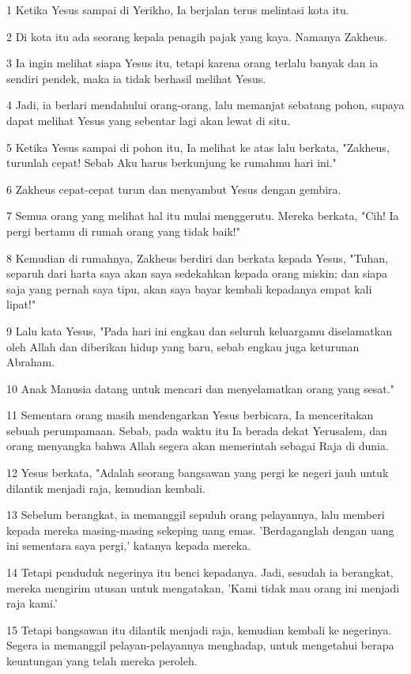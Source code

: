 \par 1 Ketika Yesus sampai di Yerikho, Ia berjalan terus melintasi kota itu.
\par 2 Di kota itu ada seorang kepala penagih pajak yang kaya. Namanya Zakheus.
\par 3 Ia ingin melihat siapa Yesus itu, tetapi karena orang terlalu banyak dan ia sendiri pendek, maka ia tidak berhasil melihat Yesus.
\par 4 Jadi, ia berlari mendahului orang-orang, lalu memanjat sebatang pohon, supaya dapat melihat Yesus yang sebentar lagi akan lewat di situ.
\par 5 Ketika Yesus sampai di pohon itu, Ia melihat ke atas lalu berkata, "Zakheus, turunlah cepat! Sebab Aku harus berkunjung ke rumahmu hari ini."
\par 6 Zakheus cepat-cepat turun dan menyambut Yesus dengan gembira.
\par 7 Semua orang yang melihat hal itu mulai menggerutu. Mereka berkata, "Cih! Ia pergi bertamu di rumah orang yang tidak baik!"
\par 8 Kemudian di rumahnya, Zakheus berdiri dan berkata kepada Yesus, "Tuhan, separuh dari harta saya akan saya sedekahkan kepada orang miskin; dan siapa saja yang pernah saya tipu, akan saya bayar kembali kepadanya empat kali lipat!"
\par 9 Lalu kata Yesus, "Pada hari ini engkau dan seluruh keluargamu diselamatkan oleh Allah dan diberikan hidup yang baru, sebab engkau juga keturunan Abraham.
\par 10 Anak Manusia datang untuk mencari dan menyelamatkan orang yang sesat."
\par 11 Sementara orang masih mendengarkan Yesus berbicara, Ia menceritakan sebuah perumpamaan. Sebab, pada waktu itu Ia berada dekat Yerusalem, dan orang menyangka bahwa Allah segera akan memerintah sebagai Raja di dunia.
\par 12 Yesus berkata, "Adalah seorang bangsawan yang pergi ke negeri jauh untuk dilantik menjadi raja, kemudian kembali.
\par 13 Sebelum berangkat, ia memanggil sepuluh orang pelayannya, lalu memberi kepada mereka masing-masing sekeping uang emas. 'Berdaganglah dengan uang ini sementara saya pergi,' katanya kepada mereka.
\par 14 Tetapi penduduk negerinya itu benci kepadanya. Jadi, sesudah ia berangkat, mereka mengirim utusan untuk mengatakan, 'Kami tidak mau orang ini menjadi raja kami.'
\par 15 Tetapi bangsawan itu dilantik menjadi raja, kemudian kembali ke negerinya. Segera ia memanggil pelayan-pelayannya menghadap, untuk mengetahui berapa keuntungan yang telah mereka peroleh.
